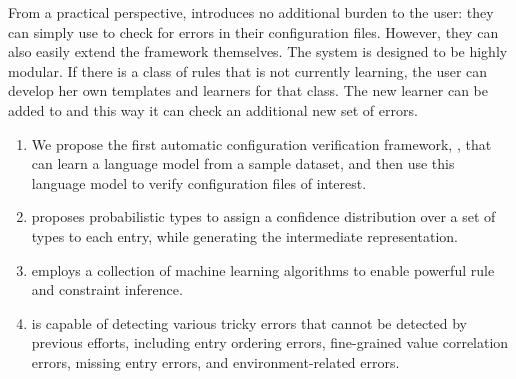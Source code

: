 {From a practical perspective, 
\app introduces no additional burden 
to the user: they can simply use \app to check for errors in their
configuration files. However, they can also easily extend the framework
themselves. The system is designed to be highly modular. If there is a
class of rules that \app is not currently learning, the user can develop
her own templates and learners for that class. The new learner can be
added to \app and this way it can check an additional new set of
errors.

\begin{enumerate}

\item We propose the first automatic configuration verification
framework, \app, that can learn a language model from a sample
dataset, and then use this language model to verify 
configuration files of interest.
 
\item \app proposes probabilistic types to assign a confidence 
distribution over a set of types to each entry, 
while generating the intermediate representation. 

\item \app employs a collection of machine learning algorithms to 
enable powerful rule and constraint inference.

\item \app is capable of detecting various tricky errors that cannot
be detected by previous efforts,
including entry ordering errors, fine-grained value correlation errors, 
missing entry errors, and environment-related errors. 

\end{enumerate}

}
